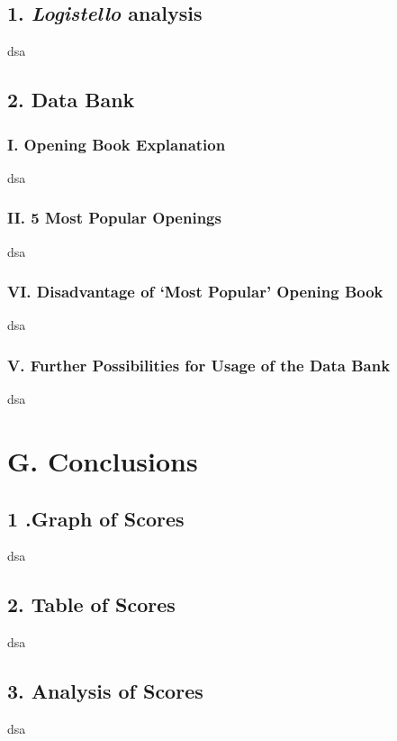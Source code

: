 \documentclass{article}
\begin{document}
\subsection*{1. \emph{Logistello} analysis}
dsa

\subsection*{2. Data Bank}
\subsubsection*{I. Opening Book Explanation}
dsa

\subsubsection*{II. 5 Most Popular Openings}
dsa

\subsubsection*{VI. Disadvantage of `Most Popular' Opening Book}
dsa

\subsubsection*{V. Further Possibilities for Usage of the Data Bank}
dsa

\section*{G. Conclusions}
\subsection*{1 .Graph of Scores}
dsa

\subsection*{2. Table of Scores}
dsa

\subsection*{3. Analysis of Scores}
dsa
\end{document}
